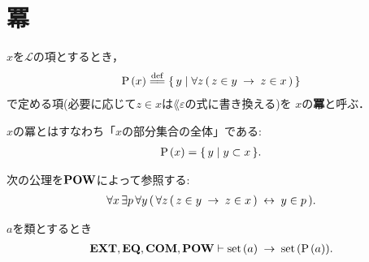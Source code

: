 \section{冪}
	\begin{screen}
		\begin{dfn}[冪]
			$x$を$\mathcal{L}$の項とするとき，
			\begin{align}
				\power{x} \defeq \Set{y}{\forall z\, (\, z \in y \rarrow z \in x\, )}
			\end{align}
			で定める項(必要に応じて$z \in x$は$\lang{\varepsilon}$の式に書き換える)を
			$x$の{\bf 冪}と呼ぶ．
		\end{dfn}
	\end{screen}
	
	$x$の冪とはすなわち「$x$の部分集合の全体」である:
	\begin{align}
		\operatorname*{P}\hspace{0.15em}(x) = \{\, y \mid y \subset x\, \}.
	\end{align}
	
	\begin{screen}
		\begin{axm}[冪の公理]
			次の公理を$\mbox{{\bf POW}}$によって参照する:
			\begin{align}
				\forall x\, \exists p\, \forall y\, 
				(\, \forall z\, (\, z \in y \hspace{0.25em}\rightarrow\hspace{0.25em} z \in x\, ) \hspace{0.25em}\leftrightarrow\hspace{0.25em} y \in p\, ).
			\end{align}
		\end{axm}
	\end{screen}
	
	\begin{screen}
		\begin{thm}[集合の冪は集合]\label{thm:power_of_a_set_is_a_set}
			$a$を類とするとき
			\begin{align}
				\mbox{{\bf EXT}},\mbox{{\bf EQ}},\mbox{\bf COM},\mbox{{\bf POW}} \vdash \operatorname*{set}\hspace{0.15em}(a) \hspace{0.25em}\rightarrow\hspace{0.25em} \operatorname*{set}\hspace{0.15em}(\operatorname*{P}\hspace{0.15em}(a)).
			\end{align}
		\end{thm}
	\end{screen}
	
